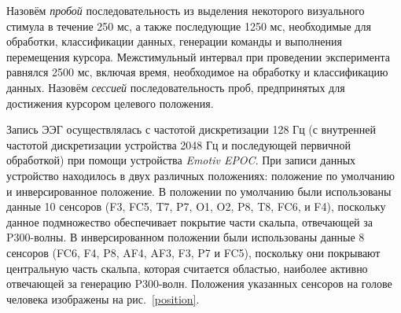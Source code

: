 \documentclass[12pt,a4paper,oneside,fleqn,leqno]{article}
\begin{document}
	\par Назовём {\it пробой} последовательность из выделения некоторого визуального стимула в течение 250 мс, а также последующие 1250 мс, необходимые для обработки, классификации данных, генерации команды и выполнения перемещения курсора. Межстимульный интервал при проведении эксперимента равнялся 2500 мс, включая время, необходимое на обработку и классификацию данных. Назовём {\it сессией} последовательность проб, предпринятых для достижения курсором целевого положения.
	\par Запись ЭЭГ осуществлялась с частотой дискретизации 128 Гц (с внутренней частотой дискретизации устройства 2048 Гц и последующей первичной обработкой) при помощи устройства {\it Emotiv EPOC}. При записи данных устройство находилось в двух различных положениях: положение по умолчанию и инверсированное положение. В положении по умолчанию были использованы данные 10 сенсоров (F3, FC5, T7, P7, O1, O2, P8, T8, FC6, и F4), поскольку данное подмножество обеспечивает покрытие части скальпа, отвечающей за P300-волны. В инверсированном положении были использованы данные 8 сенсоров (FC6, F4, P8, AF4, AF3, F3, P7 и FC5), поскольку они покрывают центральную часть скальпа, которая считается областью, наиболее активно отвечающей за генерацию P300-волн. Положения указанных сенсоров на голове человека изображены на рис.~\ref{position}.
\end{document}
